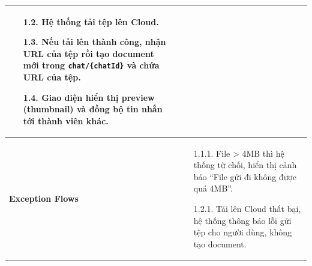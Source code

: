 \documentclass[a4paper, 12pt]{article}
\begin{document}
\begin{longtable}{|p{3.5cm}|p{12cm}|}
\begin{itemize}[leftmargin=3em, labelsep=0.5em]
			\item[1.2.] Hệ thống tải tệp lên Cloud.
			\item[1.3.] Nếu tải lên thành công, nhận URL của tệp rồi tạo document mới trong \texttt{chat/\{chatId\}} và chứa URL của tệp.
			\item[1.4.] Giao diện hiển thị preview (thumbnail) và đồng bộ tin nhắn tới thành viên khác.
		\end{itemize} \\
		\hline
		\textbf{Exception Flows} & 
		\begin{itemize}[leftmargin=3.5em, labelsep=0.5em]
			\item[1.1.1.] File > 4MB thì hệ thống từ chối, hiển thị cảnh báo “File gửi đi không được quá 4MB”.
			\item[1.2.1.] Tải lên Cloud thất bại, hệ thống thông báo lỗi gửi tệp cho người dùng, không tạo document.
		\end{itemize} \\
		\hline
	\end{longtable}
	\vspace{0.5cm}
	
\end{document}
